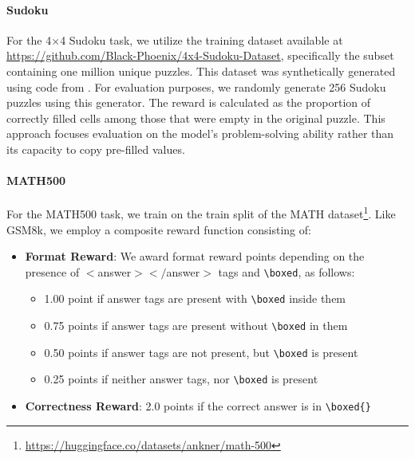 \paragraph{Sudoku}
For the 4×4 Sudoku task, we utilize the training dataset available at \url{https://github.com/Black-Phoenix/4x4-Sudoku-Dataset}, specifically the subset containing one million unique puzzles. This dataset was synthetically generated using code from \citet{arel_sudoku}. For evaluation purposes, we randomly generate 256 Sudoku puzzles using this generator.
The reward is calculated as the proportion of correctly filled cells among those that were empty in the original puzzle. This approach focuses evaluation on the model's problem-solving ability rather than its capacity to copy pre-filled values.

\paragraph{MATH500} For the MATH500 task, we train on the train split of the MATH dataset\footnote{\url{https://huggingface.co/datasets/ankner/math-500}}. Like GSM8k, we employ a composite reward function consisting of:
\begin{itemize}
    \item \textbf{Format Reward}: We award format reward points depending on the presence of  $<$answer$></$answer$>$ tags and \verb|\boxed|, as follows:
    \begin{itemize}
        \item  1.00 point if answer tags are present with \verb|\boxed| inside them
        \item 0.75 points if answer tags are present without \verb|\boxed| in them
        \item 0.50 points if answer tags are not present, but \verb|\boxed| is present
        \item 0.25 points if neither answer tags, nor \verb|\boxed| is present
    \end{itemize}
    \item \textbf{Correctness Reward}: 2.0 points if the correct answer is in \verb|\boxed{}|

\end{itemize}

